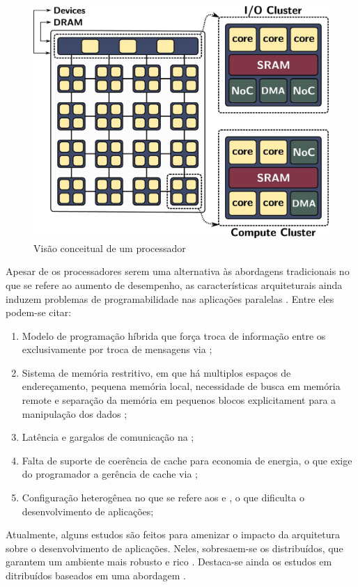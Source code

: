 \begin{figure}[bt]
	\label{fig.lw-overview}
	\centering
    \includegraphics[width=0.64\linewidth]{content/images/lw-overview.jpg}
	\caption{Visão conceitual de um processador \lw \cite{penna2021inter}}
\end{figure}


Apesar de os processadores \lws serem uma alternativa às abordagens tradicionais no que se refere ao aumento de desempenho, as características arquiteturais ainda induzem problemas de programabilidade nas aplicações paralelas \cite{Castro-PARCO:2016}. Entre eles podem-se citar:

\begin{enumerate}[label= (\roman*)]
    \item Modelo de programação híbrida que força troca de informação entre os \clusters exclusivamente por troca de mensagens via \noc \cite{kelly2013};
    \item Sistema de memória restritivo, em que há multiplos espaços de endereçamento, pequena memória local, necessidade de busca em memória remote e separação da memória em pequenos blocos explicitament para a manipulação dos dados \cite{Castro-PARCO:2016};
    \item Latência e gargalos de comunicação na \noc;
    \item Falta de suporte de coerência de cache para economia de energia, o que exige do programador a gerência de cache via \software;
    \item Configuração heterogênea no que se refere aos \cclusters e \ioclusters, o que dificulta o desenvolvimento de aplicações;
\end{enumerate}

Atualmente, alguns estudos são feitos para amenizar o impacto da arquitetura sobre o desenvolvimento de aplicações. Neles, sobresaem-se os \oss distribuídos, que garantem um ambiente mais robusto e rico \cite{asmussen_m3:_2016, kluge_operating_2014, penna:sbesc19}. Destaca-se ainda os estudos em \oss ditribuídos baseados em uma abordagem \multikernel \cite{penna2017-1,penna2017-2,penna2019}.

